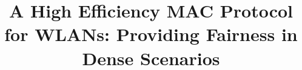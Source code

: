 \documentclass[a4paper,journal]{IEEEtran}
\providecommand{\DIFaddbegin}{} %
\providecommand{\DIFaddend}{} %
\providecommand{\DIFdelbegin}{} %
\providecommand{\DIFdelend}{} %
\begin{document}
 \title{A High Efficiency MAC Protocol for WLANs: Providing Fairness in Dense Scenarios}


  \author{
      \DIFdelbegin %
\DIFdelend \DIFaddbegin {}\DIFaddend }%




\maketitle
\end{document}
